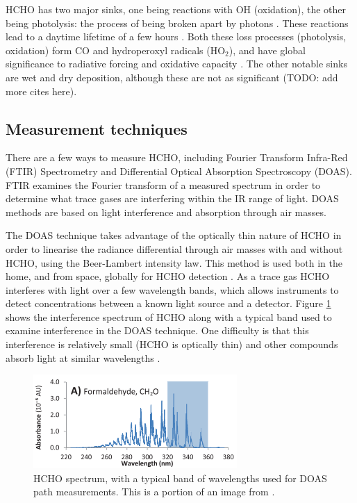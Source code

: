     HCHO has two major sinks, one being reactions with OH (oxidation), the other being photolysis: the process of being broken apart by photons \parencite{Crutzen1999, Wagner2002, Levy1972, Kefauver2014}.
    These reactions lead to a daytime lifetime of a few hours \parencite{Atkinson2000, Millet2006}.
    Both these loss processes (photolysis, oxidation) form CO and hydroperoxyl radicals (HO$_2$), and have global significance to radiative forcing and oxidative capacity \parencite{Franco2015}.
    The other notable sinks are wet and dry deposition, although these are not as significant \parencite{Atkinson2000} (TODO: add more cites here).
    
  \subsection{Measurement techniques}
    \label{LR:HCHO:Measurements}
    There are a few ways to measure HCHO, including Fourier Transform Infra-Red (FTIR) Spectrometry and Differential Optical Absorption Spectroscopy (DOAS).
    FTIR examines the Fourier transform of a measured spectrum in order to determine what trace gases are interfering within the IR range of light.
    DOAS methods are based on light interference and absorption through air masses.
    
    The DOAS technique takes advantage of the optically thin nature of HCHO in order to linearise the radiance differential through air masses with and without HCHO, using the Beer-Lambert intensity law.
    This method is used both in the home, and from space, globally for HCHO detection \parencite{Guenther1995, Abad2015, Davenport2015}.
    As a trace gas HCHO interferes with light over a few wavelength bands, which allows instruments to detect concentrations between a known light source and a detector.
    Figure \ref{LR:HCHO:Measurements:fig_HCHOSpectrum} shows the interference spectrum of HCHO along with a typical band used to examine interference in the DOAS technique.
    One difficulty is that this interference is relatively small (HCHO is optically thin) and other compounds absorb light at similar wavelengths \parencite{Davenport2015}.
    
    \begin{figure}
      \includegraphics{Figures/HCHO/HCHOAbsorbanceDavenport.png}
      \caption{ %
        HCHO spectrum, with a typical band of wavelengths used for DOAS path measurements.
        This is a portion of an image from \textcite{Davenport2015}.}
      \label{LR:HCHO:Measurements:fig_HCHOSpectrum}
    \end{figure}
    
